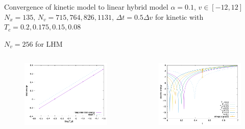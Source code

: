 \documentclass{beamer}
\begin{document}
\begin{frame}{Convergence of kinetic model to linear hybrid model}
  $\alpha = 0.1$, $v\in[-12,12]$ \\
  $N_x = 135$, $N_v = 715, 764, 826, 1131$, $\Delta t = 0.5\Delta v$ for kinetic with $T_c = 0.2, 0.175, 0.15, 0.08$

  $N_v = 256$ for LHM
  \begin{columns}
    \begin{column}{0.5\textwidth}
      \begin{figure}\centering
        \includegraphics[width=\textwidth]{img/limit_slope_totalenergy.png}
      \end{figure}
    \end{column}
    \begin{column}{0.5\textwidth}
      \begin{figure}\centering
        \includegraphics[width=\textwidth]{img/limit_ee.png}
      \end{figure}
    \end{column}
  \end{columns}
\end{frame}
\end{document}
